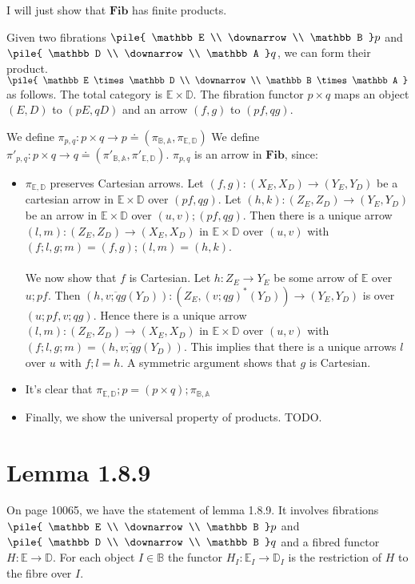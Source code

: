 \documentclass{article}
\newcommand{\mbf}{\mathbf}
\newcommand{\vrt}[2]{
\pile{
#1 \\
\downarrow \\
#2
}
}
\begin{document}
I will just show that $\mbf{Fib}$ has finite products.

Given two fibrations $\vrt{\mathbb E}{\mathbb B}p$ and $\vrt{\mathbb D}{\mathbb A}q$, we can form their product.
$\vrt{\mathbb E \times \mathbb D}{\mathbb B \times \mathbb A}$ as follows. The total category is $\mathbb E \times \mathbb D$.
The fibration functor $p \times q$ maps an object $(E,D)$ to $(pE,qD)$ and an arrow $(f,g)$ to $(pf,qg)$.

We define $\pi_{p,q} : p \times q \to p \doteq (\pi_{\mathbb B, \mathbb A},\pi_{\mathbb E, \mathbb D})$ 
We define
$\pi'_{p,q} : p \times q \to q \doteq (\pi'_{\mathbb B, \mathbb A}, \pi'_{\mathbb E, \mathbb D})$.
$\pi_{p,q}$ is an arrow in $\mbf{Fib}$, since:

\begin{itemize}
\item $\pi_{\mathbb E, \mathbb D}$ preserves Cartesian arrows. 
Let $(f,g) : (X_E,X_D) \to (Y_E,Y_D)$ be a cartesian arrow in $\mathbb E \times \mathbb D$
over $(pf,qg)$.
Let $(h,k) : (Z_E,Z_D) \to (Y_E,Y_D)$ be an arrow in $\mathbb E \times \mathbb D$ over $(u,v);(pf,qg)$. 
Then there is a unique arrow $(l,m) : (Z_E, Z_D) \to (X_E, X_D)$ in $\mathbb E \times \mathbb D$ over $(u,v)$ with $(f;l, g;m) = (f,g);(l,m) = (h,k)$.\\~\\
We now show that $f$ is Cartesian. Let $h : Z_E \to Y_E$ be some arrow of $\mathbb E$ over $u;pf$. Then $(h, \overline{v;qg}(Y_D)) : (Z_E,(v;qg)^*(Y_D)) \to (Y_E, Y_D)$ is over $(u;pf,v;qg)$. Hence there is a unique arrow $(l,m) : (Z_E, Z_D) \to (X_E, X_D)$ in $\mathbb E \times \mathbb D$ over $(u,v)$ with $(f;l, g;m) = (h,\overline{v;qg}(Y_D))$. This implies that there is a unique arrows $l$ over $u$ with $f;l = h$. A symmetric argument shows that $g$ is Cartesian.

\item It's clear that $\pi_{\mathbb E,\mathbb D};p = (p \times q);\pi_{\mathbb B, \mathbb A}$

\item Finally, we show the universal property of products. TODO.

\end{itemize}

\section*{Lemma 1.8.9}

On page 10065, we have the statement of lemma 1.8.9.
It involves fibrations $\vrt{\mathbb E}{\mathbb B}p$ and $\vrt{\mathbb D}{\mathbb B}q$
and a fibred functor $H : \mathbb E \to \mathbb D$. For each object $I \in \mathbb B$ the functor 
$H_I : \mathbb E_I \to \mathbb D_I$ is the restriction of $H$ to the fibre over $I$.
\end{document}
